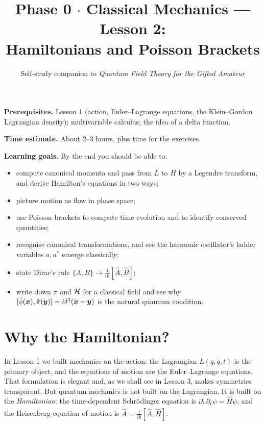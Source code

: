 \documentclass[11pt]{article}
\title{Phase 0 $\cdot$ Classical Mechanics --- Lesson 2:\\ Hamiltonians and Poisson Brackets}
\author{Self-study companion to \emph{Quantum Field Theory for the Gifted Amateur}}
\date{}
\begin{document}
\maketitle
\vspace{-2em}

\begin{tcolorbox}[colback=gray!6,colframe=gray!50!black,title={Lesson at a glance},fonttitle=\bfseries]
\textbf{Prerequisites.} Lesson 1 (action, Euler--Lagrange equations, the Klein--Gordon Lagrangian density); multivariable calculus; the idea of a delta function.

\textbf{Time estimate.} About 2--3 hours, plus time for the exercises.

\textbf{Learning goals.} By the end you should be able to:
\begin{itemize}[nosep]
  \item compute canonical momenta and pass from $L$ to $H$ by a Legendre transform, and derive Hamilton's equations in two ways;
  \item picture motion as flow in phase space;
  \item use Poisson brackets to compute time evolution and to identify conserved quantities;
  \item recognise canonical transformations, and see the harmonic oscillator's ladder variables $a,a^*$ emerge classically;
  \item state Dirac's rule $\{A,B\}\to \frac{1}{i\hbar}[\hat A,\hat B]$;
  \item write down $\pi$ and $\mathcal{H}$ for a classical field and see why $[\hat\phi(\bm{x}),\hat\pi(\bm{y})]=i\delta^3(\bm{x}-\bm{y})$ is the natural quantum condition.
\end{itemize}
\end{tcolorbox}

\tableofcontents
\bigskip

\section{Why the Hamiltonian?}

In Lesson 1 we built mechanics on the action: the Lagrangian $L(q,\dot q,t)$ is the primary object, and the equations of motion are the Euler--Lagrange equations. That formulation is elegant and, as we shall see in Lesson 3, makes symmetries transparent. But quantum mechanics is not built on the Lagrangian. It is built on the \emph{Hamiltonian}: the time-dependent Schr\"odinger equation is $i\hbar\,\partial_t\psi=\hat H\psi$, and the Heisenberg equation of motion is $\dot{\hat A}=\frac1{i\hbar}[\hat A,\hat H]$.
\end{document}
